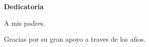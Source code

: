 \begin{center}
	{\large \bfseries  Dedicatoria}
\end{center}
\vspace{0.5cm}

A mis padres.

Gracias por su gran apoyo a traves de los años.
\newline


